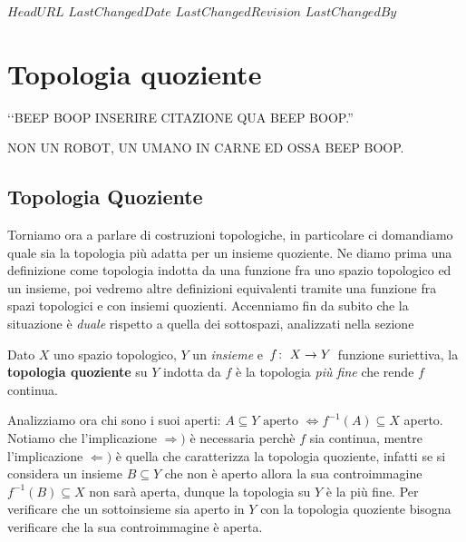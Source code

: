 \svnidlong
{$HeadURL$}
{$LastChangedDate$}
{$LastChangedRevision$}
{$LastChangedBy$}

\chapter{Topologia quoziente}

\begin{introduction}
‘‘BEEP BOOP INSERIRE CITAZIONE QUA BEEP BOOP.''
\begin{flushright}
	\textsc{NON UN ROBOT,} UN UMANO IN CARNE ED OSSA BEEP BOOP.
\end{flushright}
\end{introduction}

		\section{Topologia Quoziente}
Torniamo ora a parlare di costruzioni topologiche, in particolare ci domandiamo quale sia la topologia più adatta per un insieme quoziente. Ne diamo prima una definizione come topologia indotta da una funzione fra uno spazio topologico ed un insieme, poi vedremo altre definizioni equivalenti tramite una funzione fra spazi topologici e con insiemi quozienti.\newline
Accenniamo fin da subito che la situazione è \textit{duale} rispetto a quella dei sottospazi, analizzati nella sezione 
\begin{define}
	Dato $X$ uno spazio topologico, $Y$ un \textit{insieme} e $\funz f X Y$ funzione suriettiva, la \textbf{topologia quoziente} su $Y$ indotta da $f$ è la topologia \textit{più fine} che rende $f$ continua.
\end{define}
Analizziamo ora chi sono i suoi aperti: $\displaystyle A\subseteq Y \text{ aperto } \iff f^{-1}(A)\subseteq X$ aperto. Notiamo che l'implicazione $\Rightarrow)$ è necessaria perchè $f$ sia continua, mentre l'implicazione $\Leftarrow)$ è quella che caratterizza la topologia quoziente, infatti se si considera un insieme $B\subseteq Y$ che non è aperto allora la sua controimmagine $f^{-1}(B)\subseteq X$ non sarà aperta, dunque la topologia su $Y$ è la più fine.\newline
Per verificare che un sottoinsieme sia aperto in $Y$ con la topologia quoziente bisogna verificare che la sua controimmagine è aperta.

